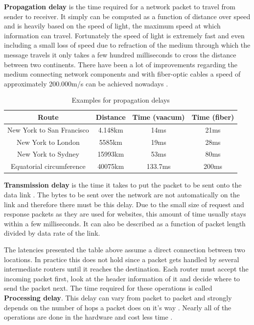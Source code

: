 \textbf{Propagation delay} is the time required for a network packet to travel from sender to receiver. It simply can be computed as a function of distance over speed and is heavily based on the speed of light, the maximum speed at which information can travel. Fortunately the speed of light is extremely fast and even including a small loss of speed due to refraction of the medium through which the message travels it only takes a few hundred milliseconds to cross the distance between two continents. There have been a lot of improvements regarding the medium connecting network components and with fiber-optic cables a speed of approximately 200.000m/s can be achieved nowadays \cite{Grigorik_2013}.

\begin{table}[h]
\begin{center}
\begin{tabular}{| c | c | c | c |}
    \hline
    Route & Distance & Time (vaacum) & Time (fiber) \\ \hline
    New York to San Francisco & 4.148km & 14ms & 21ms  \\ \hline
    New York to London & 5585km & 19ms & 28ms \\ \hline
    New York to Sydney & 15993km & 53ms & 80ms \\ \hline 
     Equatorial circumference & 40075km & 133.7ms & 200ms \\
    \hline
\end{tabular}
\caption{Examples for propagation delays \cite{Grigorik_2013}}
\end{center}
\end{table}

\textbf{Transmission delay} is the time it takes to put the packet to be sent onto the data link \cite{Grigorik_2013}. The bytes to be sent over the network are not automatically on the link and therefore there must be this delay. Due to the small size of request and response packets as they are used for websites, this amount of time usually stays within a few milliseconds. It can also be described as a function of packet length divided by data rate of the link.

The latencies presented the table above assume a direct connection between two locations. In practice this does not hold since a packet gets handled by several intermediate routers until it reaches the destination. Each router must accept the incoming packet first, look at the header information of it and decide where to send the packet next. The time required for these operations is called \textbf{Processing delay}.  This delay can vary from packet to packet and strongly depends on the number of hops a packet does on it's way \cite{Killelea_2002}. Nearly all of the operations are done in the hardware and cost less time \cite{Grigorik_2013}.

